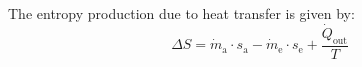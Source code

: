 The entropy production due to heat transfer is given by:  
\[
\Delta S = \dot{m}_{\text{a}} \cdot s_{\text{a}} - \dot{m}_{\text{e}} \cdot s_{\text{e}} + \frac{\dot{Q}_{\text{out}}}{T}
\]